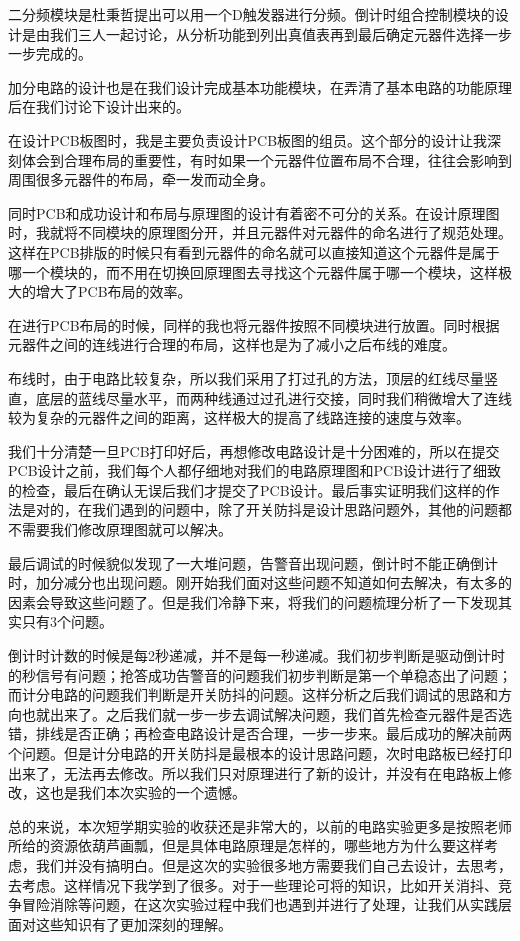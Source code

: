 \documentclass{../source/Experiment}
\begin{document}
        二分频模块是杜秉哲提出可以用一个D触发器进行分频。倒计时组合控制模块的设计是由我们三人一起讨论，从分析功能到列出真值表再到最后确定元器件选择一步一步完成的。

        加分电路的设计也是在我们设计完成基本功能模块，在弄清了基本电路的功能原理后在我们讨论下设计出来的。

        在设计PCB板图时，我是主要负责设计PCB板图的组员。这个部分的设计让我深刻体会到合理布局的重要性，有时如果一个元器件位置布局不合理，往往会影响到周围很多元器件的布局，牵一发而动全身。
        
        同时PCB和成功设计和布局与原理图的设计有着密不可分的关系。在设计原理图时，我就将不同模块的原理图分开，并且元器件对元器件的命名进行了规范处理。这样在PCB排版的时候只有看到元器件的命名就可以直接知道这个元器件是属于哪一个模块的，而不用在切换回原理图去寻找这个元器件属于哪一个模块，这样极大的增大了PCB布局的效率。
        
        在进行PCB布局的时候，同样的我也将元器件按照不同模块进行放置。同时根据元器件之间的连线进行合理的布局，这样也是为了减小之后布线的难度。

        布线时，由于电路比较复杂，所以我们采用了打过孔的方法，顶层的红线尽量竖直，底层的蓝线尽量水平，而两种线通过过孔进行交接，同时我们稍微增大了连线较为复杂的元器件之间的距离，这样极大的提高了线路连接的速度与效率。

        我们十分清楚一旦PCB打印好后，再想修改电路设计是十分困难的，所以在提交PCB设计之前，我们每个人都仔细地对我们的电路原理图和PCB设计进行了细致的检查，最后在确认无误后我们才提交了PCB设计。最后事实证明我们这样的作法是对的，在我们遇到的问题中，除了开关防抖是设计思路问题外，其他的问题都不需要我们修改原理图就可以解决。

        最后调试的时候貌似发现了一大堆问题，告警音出现问题，倒计时不能正确倒计时，加分减分也出现问题。刚开始我们面对这些问题不知道如何去解决，有太多的因素会导致这些问题了。但是我们冷静下来，将我们的问题梳理分析了一下发现其实只有3个问题。
        
        倒计时计数的时候是每2秒递减，并不是每一秒递减。我们初步判断是驱动倒计时的秒信号有问题；抢答成功告警音的问题我们初步判断是第一个单稳态出了问题；而计分电路的问题我们判断是开关防抖的问题。这样分析之后我们调试的思路和方向也就出来了。之后我们就一步一步去调试解决问题，我们首先检查元器件是否选错，排线是否正确；再检查电路设计是否合理，一步一步来。最后成功的解决前两个问题。但是计分电路的开关防抖是最根本的设计思路问题，次时电路板已经打印出来了，无法再去修改。所以我们只对原理进行了新的设计，并没有在电路板上修改，这也是我们本次实验的一个遗憾。

        总的来说，本次短学期实验的收获还是非常大的，以前的电路实验更多是按照老师所给的资源依葫芦画瓢，但是具体电路原理是怎样的，哪些地方为什么要这样考虑，我们并没有搞明白。但是这次的实验很多地方需要我们自己去设计，去思考，去考虑。这样情况下我学到了很多。对于一些理论可将的知识，比如开关消抖、竞争冒险消除等问题，在这次实验过程中我们也遇到并进行了处理，让我们从实践层面对这些知识有了更加深刻的理解。
\end{document}

